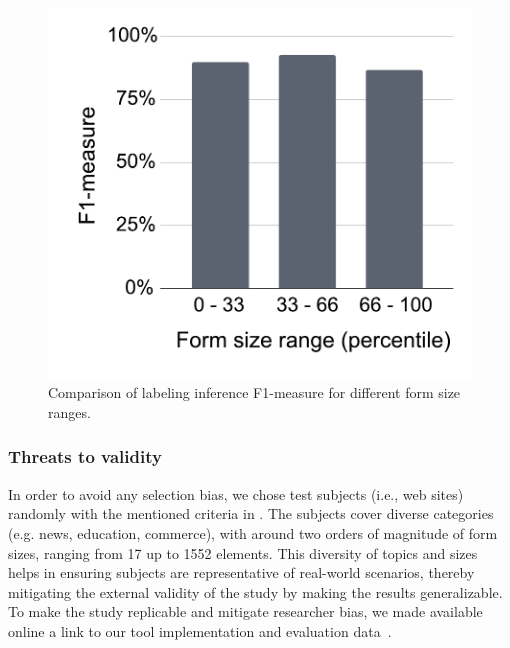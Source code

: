 \begin{figure}
	\centering
	\includegraphics[width=0.45\linewidth,trim=11mm 9mm 7mm 7mm,clip]{accessibility_repair/figures/stratified.pdf}
	\caption{Comparison of labeling inference F1-measure for different form size ranges.}
	\label{fig:stratified}
\end{figure}

\subsubsection{Threats to validity}
In order to avoid any selection bias, 
we chose test subjects (i.e., web sites) 
randomly with the mentioned 
criteria in . 
The subjects cover diverse categories 
(e.g. news, education, commerce), 
with around two orders of magnitude of 
form sizes, ranging from 17 up to 1552 elements.
This diversity of topics and sizes helps in 
ensuring subjects are representative 
of real-world scenarios, thereby mitigating the 
external validity of the study by making the 
results generalizable.
To make the study replicable and mitigate researcher bias, 
we made available online a link to our tool 
implementation and evaluation data~\cite{tool-and-data}.



